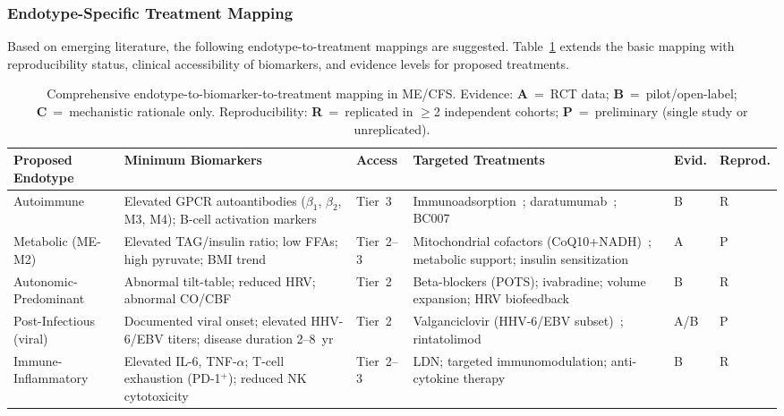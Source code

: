 \subsubsection*{Endotype-Specific Treatment Mapping}

Based on emerging literature, the following endotype-to-treatment mappings are suggested. Table~\ref{tab:endotype-comprehensive} extends the basic mapping with reproducibility status, clinical accessibility of biomarkers, and evidence levels for proposed treatments.

\begin{table}[htbp]
\centering
\caption{Comprehensive endotype-to-biomarker-to-treatment mapping in ME/CFS. Evidence: \textbf{A}~=~RCT data; \textbf{B}~=~pilot/open-label; \textbf{C}~=~mechanistic rationale only. Reproducibility: \textbf{R}~=~replicated in $\geq$2 independent cohorts; \textbf{P}~=~preliminary (single study or unreplicated).}
\label{tab:endotype-comprehensive}
\small
\begin{tabular}{@{}p{2.2cm}p{3.2cm}p{1.2cm}p{3.5cm}p{1cm}p{1.3cm}@{}}
\toprule
\textbf{Proposed Endotype} & \textbf{Minimum Biomarkers} & \textbf{Access} & \textbf{Targeted Treatments} & \textbf{Evid.} & \textbf{Reprod.} \\
\midrule
Autoimmune & Elevated GPCR autoantibodies ($\beta_1$, $\beta_2$, M3, M4); B-cell activation markers & Tier~3 &
  Immunoadsorption~\cite{Scheibenbogen2018immunoadsorption}; daratumumab~\cite{Fluge2025daratumumab}; BC007~\cite{Hohberger2021bc007} & B & R \\
\addlinespace
Metabolic (ME-M2) & Elevated TAG/insulin ratio; low FFAs; high pyruvate; BMI trend~\cite{Germain2020metabolic} & Tier~2--3 &
  Mitochondrial cofactors (CoQ10+NADH)~\cite{CastroMarrero2021fatigue}; metabolic support; insulin sensitization & A & P \\
\addlinespace
Autonomic-Predominant & Abnormal tilt-table; reduced HRV; abnormal CO/CBF~\cite{VanCampenEtAl2024} & Tier~2 &
  Beta-blockers (POTS); ivabradine; volume expansion; HRV biofeedback~\cite{Slomko2020autonomic} & B & R \\
\addlinespace
Post-Infectious (viral) & Documented viral onset; elevated HHV-6/EBV titers; disease duration 2--8~yr~\cite{Strayer2020rintatolimod} & Tier~2 &
  Valganciclovir (HHV-6/EBV subset)~\cite{Montoya2013valganciclovir}; rintatolimod~\cite{Strayer2020rintatolimod} & A/B & P \\
\addlinespace
Immune-Inflammatory & Elevated IL-6, TNF-$\alpha$; T-cell exhaustion (PD-1$^+$); reduced NK cytotoxicity~\cite{EatonFitch2019} & Tier~2--3 &
  LDN; targeted immunomodulation; anti-cytokine therapy & B & R \\
\bottomrule
\end{tabular}
\end{table}

